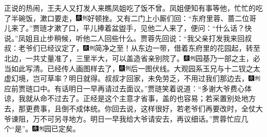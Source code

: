 {{{{{{{正说的热闹，王夫人又打发人来瞧凤姐吃了饭不曾。凤姐便知有事等他，忙忙的吃了半碗饭，漱口要走，{\includegraphics[width=3mm]{../Images/00004}\includegraphics[width=3mm]{../Images/00011}\footnotesize \kaishu 好顿挫。}又有二门上小厮们回：“东府里蓉、蔷二位哥儿来了。”贾琏才漱了口，平儿捧着盆盥手，见他二人来了，便问：“什么话？快说。”凤姐且止步稍候，听他二人回些什么。贾蓉先回说：“我父亲打发我来回叔叔：老爷们已经议定了，{\includegraphics[width=3mm]{../Images/00004}\includegraphics[width=3mm]{../Images/00011}\footnotesize \kaishu 简净之至！}从东边一带，借着东府里的花园起，转至北边，一共丈量准了，三里半大，可以盖造省亲别院了。{\includegraphics[width=3mm]{../Images/00004}\includegraphics[width=3mm]{../Images/00011}\footnotesize \kaishu 园基乃一部之主，必当如此写清。}已经传人画图样去了，{\includegraphics[width=3mm]{../Images/00004}\includegraphics[width=3mm]{../Images/00011}\footnotesize \kaishu 后一图伏线。大观园系玉兄与十二钗之太虚幻境，岂可草率？}明日就得。叔叔才回家，未免劳乏，不用过我们那边去，{\includegraphics[width=3mm]{../Images/00004}\includegraphics[width=3mm]{../Images/00011}\footnotesize \kaishu 应前贾琏口中。}有话明日一早再请过去面议。”贾琏笑着说道：“多谢大爷费心体谅，我就从命不过去了。正经是这个主意才省事，盖的也容易；若采置别处地方去，那更费事，且倒不成体统。你回去说，这样很好，若老爷们再要改时，全仗大爷谏阻，万不可另寻地方。明日一早我给大爷请安去，再议细话。”贾蓉忙应几个“是”。{\includegraphics[width=3mm]{../Images/00004}\includegraphics[width=3mm]{../Images/00011}\footnotesize \kaishu 园已定矣。}

}}}}}}}
